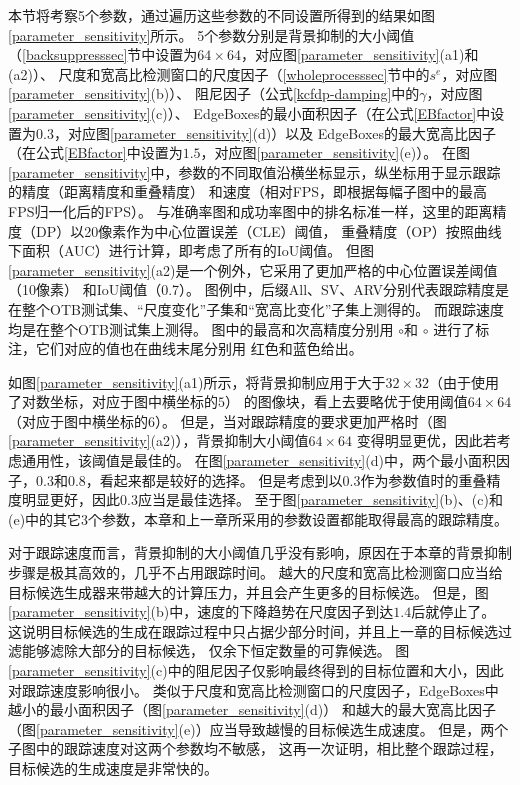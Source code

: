 本节将考察5个参数，通过遍历这些参数的不同设置所得到的结果如图\ref{parameter_sensitivity}所示。
5个参数分别是背景抑制的大小阈值（\ref{backsuppresssec}节中设置为$64\times64$，对应图\ref{parameter_sensitivity}(a1)和(a2)）、
尺度和宽高比检测窗口的尺度因子（\ref{wholeprocesssec}节中的$s^e$，对应图\ref{parameter_sensitivity}(b)）、
阻尼因子（公式\ref{kcfdp-damping}中的$\gamma$，对应图\ref{parameter_sensitivity}(c)）、
EdgeBoxes的最小面积因子（在公式\ref{EBfactor}中设置为$0.3$，对应图\ref{parameter_sensitivity}(d)）以及
EdgeBoxes的最大宽高比因子（在公式\ref{EBfactor}中设置为$1.5$，对应图\ref{parameter_sensitivity}(e)）。
在图\ref{parameter_sensitivity}中，参数的不同取值沿横坐标显示，纵坐标用于显示跟踪的精度（距离精度和重叠精度）
和速度（相对FPS，即根据每幅子图中的最高FPS归一化后的FPS）。
与准确率图和成功率图中的排名标准一样，这里的距离精度（DP）以20像素作为中心位置误差（CLE）阈值，
重叠精度（OP）按照曲线下面积（AUC）进行计算，即考虑了所有的IoU阈值。
但图\ref{parameter_sensitivity}(a2)是一个例外，它采用了更加严格的中心位置误差阈值（10像素）
和IoU阈值（0.7）。
图例中，后缀All、SV、ARV分别代表跟踪精度是在整个OTB测试集、``尺度变化''子集和``宽高比变化''子集上测得的。
而跟踪速度均是在整个OTB测试集上测得。
图中的最高和次高精度分别用 {\color[HTML]{FE0000} $\boldsymbol{\circ}$}和{\color[HTML]{3531FF} $\boldsymbol{\circ}$}
进行了标注，它们对应的值也在曲线末尾分别用 {\color[HTML]{FE0000}红色}和{\color[HTML]{3531FF}蓝色}给出。

如图\ref{parameter_sensitivity}(a1)所示，将背景抑制应用于大于$32\times32$（由于使用了对数坐标，对应于图中横坐标的$5$）
的图像块，看上去要略优于使用阈值$64\times64$（对应于图中横坐标的$6$）。
但是，当对跟踪精度的要求更加严格时（图\ref{parameter_sensitivity}(a2)），背景抑制大小阈值$64\times64$
变得明显更优，因此若考虑通用性，该阈值是最佳的。
在图\ref{parameter_sensitivity}(d)中，两个最小面积因子，$0.3$和$0.8$，看起来都是较好的选择。
但是考虑到以$0.3$作为参数值时的重叠精度明显更好，因此$0.3$应当是最佳选择。
至于图\ref{parameter_sensitivity}(b)、(c)和(e)中的其它3个参数，本章和上一章所采用的参数设置都能取得最高的跟踪精度。

对于跟踪速度而言，背景抑制的大小阈值几乎没有影响，原因在于本章的背景抑制步骤是极其高效的，几乎不占用跟踪时间。
越大的尺度和宽高比检测窗口应当给目标候选生成器来带越大的计算压力，并且会产生更多的目标候选。
但是，图\ref{parameter_sensitivity}(b)中，速度的下降趋势在尺度因子到达$1.4$后就停止了。
这说明目标候选的生成在跟踪过程中只占据少部分时间，并且上一章的目标候选过滤能够滤除大部分的目标候选，
仅余下恒定数量的可靠候选。
图\ref{parameter_sensitivity}(c)中的阻尼因子仅影响最终得到的目标位置和大小，因此对跟踪速度影响很小。
类似于尺度和宽高比检测窗口的尺度因子，EdgeBoxes中越小的最小面积因子（图\ref{parameter_sensitivity}(d)）
和越大的最大宽高比因子（图\ref{parameter_sensitivity}(e)）应当导致越慢的目标候选生成速度。
但是，两个子图中的跟踪速度对这两个参数均不敏感，
这再一次证明，相比整个跟踪过程，目标候选的生成速度是非常快的。



